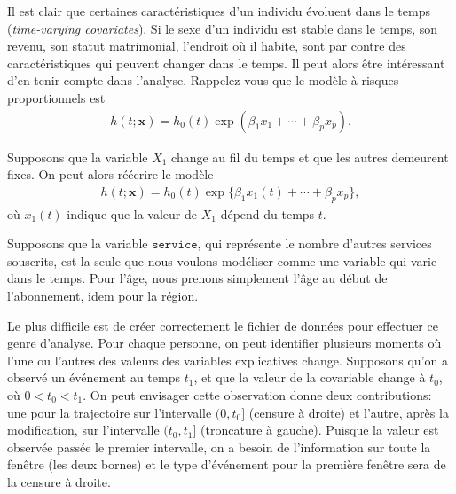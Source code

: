 \documentclass[
  11pt,
  letterpaper,
]{scrbook}
\theoremstyle{definition}
\theoremstyle{remark}
\begin{document}
Il est clair que certaines caractéristiques d'un individu évoluent dans
le temps (\emph{time-varying covariates}). Si le sexe d'un individu est
stable dans le temps, son revenu, son statut matrimonial, l'endroit où
il habite, sont par contre des caractéristiques qui peuvent changer dans
le temps. Il peut alors être intéressant d'en tenir compte dans
l'analyse. Rappelez-vous que le modèle à risques proportionnels est
\begin{align*}
h(t; \boldsymbol{x}) = h_0(t) \exp(\beta_1x_1 + \cdots + \beta_px_p).
\end{align*}

Supposons que la variable \(X_1\) change au fil du temps et que les
autres demeurent fixes. On peut alors réécrire le modèle \begin{align*}
h(t; \boldsymbol{x}) = h_0(t) \exp\{\beta_1x_1(t) + \cdots + \beta_px_p\},
\end{align*} où \(x_1(t)\) indique que la valeur de \(X_1\) dépend du
temps \(t\).

Supposons que la variable \(\texttt{service}\), qui représente le nombre
d'autres services souscrits, est la seule que nous voulons modéliser
comme une variable qui varie dans le temps. Pour l'âge, nous prenons
simplement l'âge au début de l'abonnement, idem pour la région.

Le plus difficile est de créer correctement le fichier de données pour
effectuer ce genre d'analyse. Pour chaque personne, on peut identifier
plusieurs moments où l'une ou l'autres des valeurs des variables
explicatives change. Supposons qu'on a observé un événement au temps
\(t_1\), et que la valeur de la covariable change à \(t_0\), où
\(0 < t_0 < t_1\). On peut envisager cette observation donne deux
contributions: une pour la trajectoire sur l'intervalle \((0, t_0]\)
(censure à droite) et l'autre, après la modification, sur l'intervalle
\((t_0, t_1]\) (troncature à gauche). Puisque la valeur est observée
passée le premier intervalle, on a besoin de l'information sur toute la
fenêtre (les deux bornes) et le type d'événement pour la première
fenêtre sera de la censure à droite.
\end{document}

